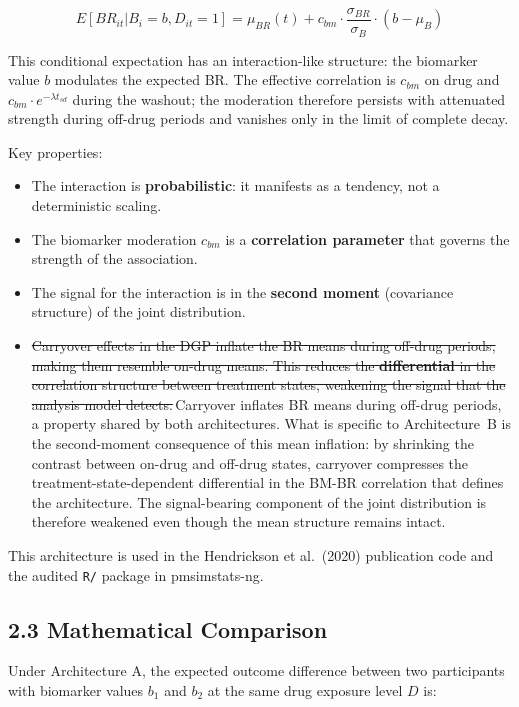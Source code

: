\documentclass[
]{article}
\begin{document}
\[E[BR_{it} | B_i = b, D_{it} = 1] = \mu_{BR}(t) + c_{bm}
\cdot \frac{\sigma_{BR}}{\sigma_B} \cdot (b - \mu_B)\]

This conditional expectation has an interaction-like structure:
the biomarker value \(b\) modulates the expected BR. The effective
correlation is \(c_{bm}\) on drug and \(c_{bm} \cdot
e^{-\lambda t_{sd}}\) during the washout; the moderation therefore
persists with attenuated strength during off-drug periods and
vanishes only in the limit of complete decay.

Key properties:

\begin{itemize}
\item The interaction is \textbf{probabilistic}: it manifests as a
  tendency, not a deterministic scaling.
\item The biomarker moderation $c_{bm}$ is a \textbf{correlation
  parameter} that governs the strength of the association.
\item The signal for the interaction is in the \textbf{second moment}
  (covariance structure) of the joint distribution.
\item \textcolor{delred}{\sout{Carryover effects in the DGP inflate the BR means during off-drug periods, making them resemble on-drug means. This reduces the \textbf{differential} in the correlation structure between treatment states, weakening the signal that the analysis model detects.}}\,\textcolor{addblue}{Carryover inflates BR means during off-drug periods, a property shared by both architectures. What is specific to Architecture~B is the second-moment consequence of this mean inflation: by shrinking the contrast between on-drug and off-drug states, carryover compresses the treatment-state-dependent differential in the BM-BR correlation that defines the architecture. The signal-bearing component of the joint distribution is therefore weakened even though the mean structure remains intact.}
\end{itemize}

This architecture is used in the Hendrickson et al.~(2020)
publication code and the audited \texttt{R/} package in pmsimstats-ng.

\subsection{2.3 Mathematical Comparison}

Under Architecture A, the expected outcome difference between
two participants with biomarker values \(b_1\) and \(b_2\) at the
same drug exposure level \(D\) is:
\end{document}
